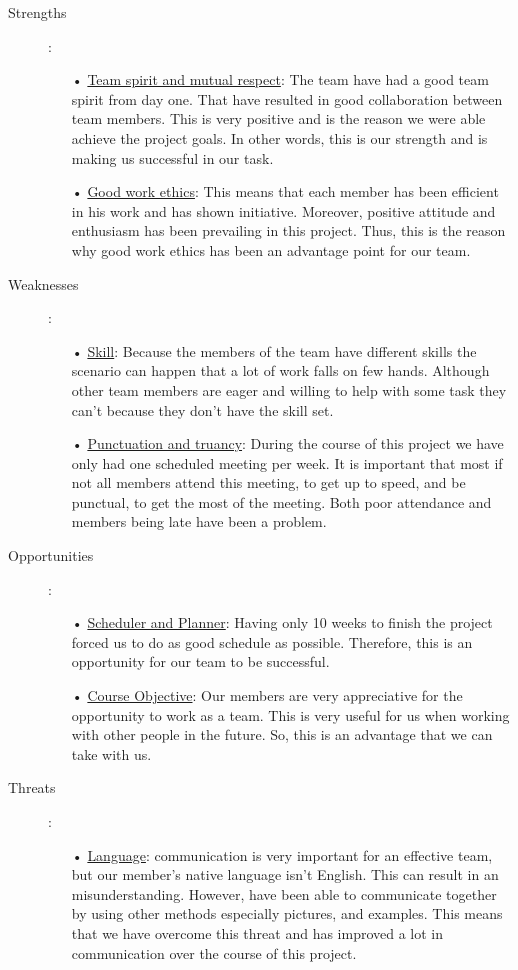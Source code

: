 \documentclass[11pt]{article}
\begin{document}
\begin{description}
\item[Strengths]:
	\begin{itemize}
	\item[•] \underline{Team spirit and mutual respect}: The team have had a good team spirit from day one. That have resulted in good collaboration between team members. This is very positive and is the reason we were able achieve the project goals. In other words, this is our strength and is making us successful in our task. 
	\item[•] \underline{Good work ethics}: This means that each member has been efficient in his work and has shown initiative. Moreover, positive attitude and enthusiasm has been prevailing in this project. Thus, this is the reason why good work ethics has been an advantage point for our team.
  	\end{itemize}				
		
\item[Weaknesses]:
	\begin{itemize}
	\item[•] \underline{Skill}: Because the members of the team have different skills the scenario can happen that a lot of work falls on few hands. Although other team members are eager and willing to help with some task they can't because they don't have the skill set.
	\item[•] \underline{Punctuation and truancy}: During the course of this project we have only had one scheduled meeting per week. It is important that most if not all members attend this meeting, to get up to speed, and be punctual, to get the most of the meeting. Both poor attendance and members being late have been a problem. 
  	\end{itemize}					

\item[Opportunities]:
	\begin{itemize}
	\item[•] \underline{Scheduler and Planner}: Having only 10 weeks to finish the project forced us to do as good schedule as possible. Therefore, this is an opportunity for our team to be successful. 
	\item[•] \underline{Course Objective}: Our members are very appreciative for the opportunity to work as a team. This is very useful for us when working with other people in the future. So, this is an advantage that we can take with us.
  	\end{itemize}				

\item[Threats]:
	\begin{itemize}
	\item[•] \underline{Language}: communication is very important for an effective team, but our member's native language isn't English. This can result in an misunderstanding. However, have been able to communicate together by using other methods especially pictures, and examples. This means that we have overcome this threat and has improved a lot in communication over the course of this project.
  	\end{itemize}					
\end{description} 
\newpage
		
\end{document}
